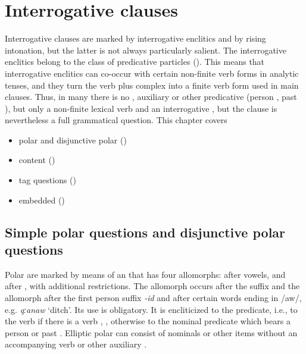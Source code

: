 \chapter{Interrogative clauses}
\label{cpt:Interrogative clauses}

Interrogative clauses are marked by interrogative enclitics and by rising intonation, but the latter is not always particularly salient. The interrogative enclitics belong to the class of predicative particles (). This means that interrogative enclitics can co-occur with certain non-finite verb forms in analytic tenses, and they turn the verb plus  complex into a finite verb form used in main clauses. Thus, in many  there is no , auxiliary or other predicative  (person , past ), but only a non-finite lexical verb and an interrogative , but the clause is nevertheless a full grammatical question. This chapter covers

\begin{itemize}
	\item	polar  and disjunctive polar  ()
	\item	content  ()
	\item	{}tag questions ()
	\item	embedded  ()
\end{itemize}



\section{Simple polar questions and disjunctive polar questions}
\label{sec:Simple polar questions and disjunctive polar questions}

Polar  are marked by means of an  that has four allomorphs:  after vowels, and  after , with additional restrictions. The allomorph  occurs after the  suffix  and the allomorph  after the first person suffix \textit{-id} and after certain words ending in /aw/, e.g. \textit{qːanaw} `ditch'. Its use is obligatory. It is encliticized to the predicate, i.e., to the verb if there is a verb , , otherwise to the nominal predicate which bears a person or past  . Elliptic polar  can consist of nominals or other items without an accompanying verb or other auxiliary . 

